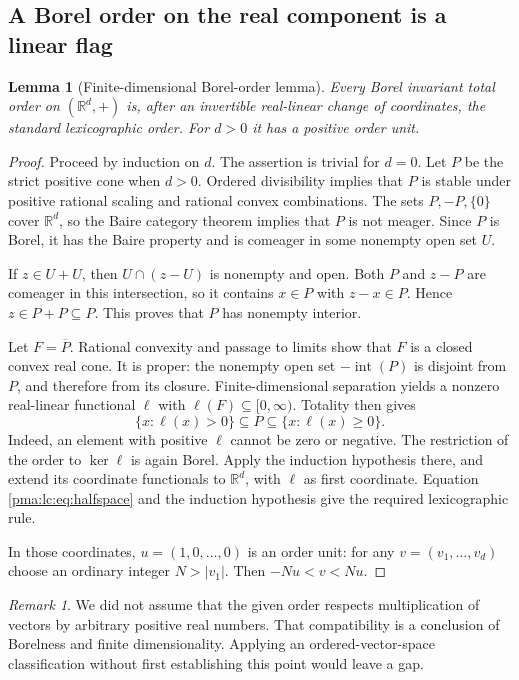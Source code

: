 \documentclass[11pt]{article}
\numberwithin{equation}{section}
\newtheorem{lemma}[lemma]{Lemma}
\theoremstyle{definition}
\theoremstyle{remark}
\newtheorem{remark}[remark]{Remark}
\newcommand{\R}{\mathbb R}
\newcommand{\Int}{\operatorname{int}}
\begin{document}
\subsection{A Borel order on the real component is a linear flag}
\begin{lemma}[Finite-dimensional Borel-order lemma]\label{pma:lc:lem:flag}
Every Borel invariant total order on $(\R^d,+)$ is, after an invertible
real-linear change of coordinates, the standard lexicographic order.
For $d>0$ it has a positive order unit.
\end{lemma}
\begin{proof}
Proceed by induction on $d$. The assertion is trivial for $d=0$. Let
$P$ be the strict positive cone when $d>0$. Ordered divisibility implies
that $P$ is stable under positive rational scaling and rational convex
combinations. The sets $P,-P,\{0\}$ cover $\R^d$, so the Baire category
theorem implies that $P$ is not meager. Since $P$ is Borel, it has the
Baire property and is comeager in some nonempty open set $U$.

If $z\in U+U$, then $U\cap(z-U)$ is nonempty and open. Both $P$ and
$z-P$ are comeager in this intersection, so it contains $x\in P$ with
$z-x\in P$. Hence $z\in P+P\subseteq P$. This proves that $P$ has
nonempty interior.

Let $F=\overline P$. Rational convexity and passage to limits show that
$F$ is a closed convex real cone. It is proper: the nonempty open set
$-\Int(P)$ is disjoint from $P$, and therefore from its closure.
Finite-dimensional separation yields a nonzero real-linear functional
$\ell$ with $\ell(F)\subseteq[0,\infty)$. Totality then gives
\begin{equation}\label{pma:lc:eq:halfspace}
 \{x:\ell(x)>0\}\subseteq P\subseteq\{x:\ell(x)\ge0\}.
\end{equation}
Indeed, an element with positive $\ell$ cannot be zero or negative.
The restriction of the order to $\ker\ell$ is again Borel. Apply the
induction hypothesis there, and extend its coordinate functionals to
$\R^d$, with $\ell$ as first coordinate. Equation \eqref{pma:lc:eq:halfspace}
and the induction hypothesis give the required lexicographic rule.

In those coordinates, $u=(1,0,\ldots,0)$ is an order unit: for any
$v=(v_1,\ldots,v_d)$ choose an ordinary integer $N>|v_1|$. Then
$-Nu<v<Nu$.
\end{proof}

\begin{remark}
We did not assume that the given order respects multiplication of vectors
by arbitrary positive real numbers. That compatibility is a conclusion of
Borelness and finite dimensionality. Applying an ordered-vector-space
classification without first establishing this point would leave a gap.
\end{remark}
\end{document}
